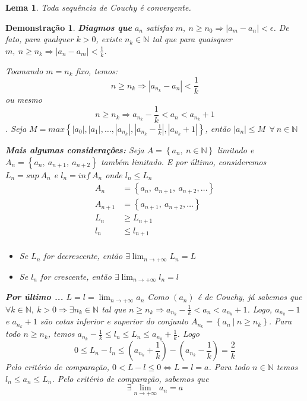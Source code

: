 \documentclass[12pt,openany, letterpaper]{book}
\newtheorem{lemma}{Lema}[section]
\newtheorem{demonstration}{Demonstração}
\begin{document}
\begin{lemma}
Toda sequência de Couchy é convergente. 
\end{lemma}

\begin{demonstration}
\textbf{Diagmos que} $a_n$ satisfaz $m, \ n \geq n_0 \Rightarrow |a_m - a_n| < \epsilon$. De fato, para qualquer $k > 0$, existe $n_k \in \mathds{N}$ tal que para quaisquer $ m, \ n \geq n_k \Rightarrow |a_n - a_m| < \displaystyle{\frac{1}{k}}$.

Toamando $m = n_k$ fixo, temos: $$ n \geq n_k \Rightarrow |a_{n_k} - a_n| < \frac{1}{k} $$ ou mesmo $$ n \geq n_k \Rightarrow a_{n_k} - \frac{1}{k} < a_n < a_{n_k} + 1 $$. Seja $M = max\left\{ |a_0|, |a_1|, \hdots , |a_{n_k}|, |a_{n_k} - \frac{1}{k}|, |a_{n_k} + 1| \right\}$, então $|a_n| \leq M \ \ \forall \ n \in \mathds{N}$

\textbf{Mais algumas considerações:} Seja $A = \left\{ a_n, \ n \in \mathds{N} \right\}$ limitado e $A_n = \left\{ a_n, \ a_{n+1}, \ a_{n+2} \right\}$ também limitado. E por último, consideremos $L_n = sup \ A_n$ e $l_n = inf \ A_n$ onde $l_n \leq L_n$
\begin{align*}
A_n &= \left\{ a_n, \ a_{n+1}, \ a_{n+2}, \hdots \right\} \\
A_{n+1} &= \left\{ a_{n+1}, \ a_{n+2}, \hdots \right\} \\
L_n  &\geq L_{n+1} \\
l_n & \leq l_{n+1} \\
\end{align*}
\begin{itemize}
\item Se $L_n$ for decrescente, então $\displaystyle{\exists \lim_{n \rightarrow +\infty} L_n = L}$
\item Se $l_n$ for crescente, então $\displaystyle{\exists \lim_{n \rightarrow +\infty} l_n = l}$
\end{itemize}
\textbf{Por último ...} $\displaystyle{L = l = \lim_{n \rightarrow +\infty} a_n}$ Como $(a_n)$ é de Couchy, já sabemos que $\forall k \in \mathds{N}, \ k > 0 \Rightarrow \exists n_k \in \mathds{N}$ tal que $n \geq n_k \Rightarrow a_{n_k} - \frac{1}{k} < a_n < a_{n_k} + 1$. Logo, $a_{n_k} - 1 $ e $a_{n_k} + 1 $ são cotas inferior e superior do conjunto $A_{n_k} = \left\{ a_n \ | \ n \geq n_k \right\}$. Para todo $n \geq n_k$, temos $a_{n_k} - \frac{1}{k} \leq l_n \leq L_n \leq a_{n_k} + \frac{1}{k}$. Logo $$ 0 \leq L_n - l_n \leq (a_{n_k} + \frac{1}{k}) - (a_{n_k} - \frac{1}{k}) = \frac{2}{k}$$ Pelo critério de comparação, $ 0 < L - l \leq 0 \Longleftrightarrow L = l = a $. Para todo $n \in \mathds{N}$ temos $ l_n \leq a_n \leq L_n$. Pelo critério de comparação, sabemos que $$ \exists \lim_{n \rightarrow +\infty} a_n = a $$
\end{demonstration}
\end{document}
